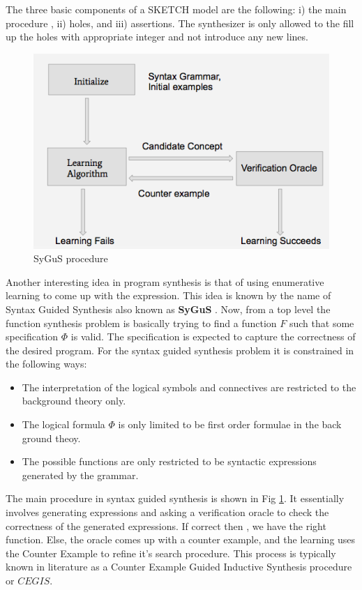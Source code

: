 \documentclass{article}
\begin{document}
The three basic components of a SKETCH model are the following: i) the main
procedure , ii) holes, and iii) assertions.  The synthesizer is only allowed to
the fill up the holes with appropriate integer and not introduce any new lines. 

\begin{figure}[h]
  \centering
  \includegraphics[scale = 0.6]{workflow.png}
  \caption{SyGuS procedure \cite{sygus}}
  \label{fig:sygus}
\end{figure}

Another interesting idea in program synthesis is that of using enumerative
learning to come up with the expression. This idea is known by the name of
Syntax Guided Synthesis also known as \textbf{SyGuS} \cite{sygus}. Now, from a
top level the function synthesis problem is basically trying to find a function
$F$ such that some specification $\Phi$ is valid. The specification is expected
to capture the correctness of the desired program. For the syntax guided
synthesis problem it is constrained in the following ways:

\begin{itemize}
    \item The interpretation of the logical symbols and connectives
	are restricted to the background theory only.
    \item The logical formula $\Phi$ is only limited to be first order formulae in
	the back ground theoy.
    \item The possible functions are only restricted to be syntactic expressions
	generated by the grammar.
\end{itemize}

The main procedure in syntax guided synthesis is shown in Fig \ref{fig:sygus}.  
It essentially involves generating expressions and asking a verification oracle
to check the correctness of the generated expressions. If correct then , we
have the right function. Else, the oracle comes up with a counter example, and
the learning uses the Counter Example to refine it's search procedure. This
process is typically known in literature as a Counter Example Guided Inductive
Synthesis procedure or $CEGIS$.
\end{document}
